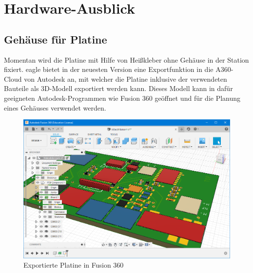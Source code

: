 \documentclass[a4paper, twoside, 12pt, openright]{memoir}
\begin{document}
\section{Hardware-Ausblick}
\subsection{Gehäuse für Platine}
Momentan wird die Platine mit Hilfe von Heißkleber ohne Gehäuse in der Station fixiert.
\ac{eagle} bietet in der neuesten Version eine Exportfunktion in die A360-Cloud von Autodesk an, mit welcher die Platine inklusive der verwendeten Bauteile als 3D-Modell exportiert werden kann.
Dieses Modell kann in dafür geeigneten Autodesk-Programmen wie Fusion 360 geöffnet und für die Planung eines Gehäuses verwendet werden.
\begin{figure}[H]
	\centering
	\includegraphics[width=.9\linewidth]{images/hardware-ausblick/fusion360.png}
	\caption{Exportierte Platine in Fusion 360}
\end{figure}


\cleartoverso
\end{document}
